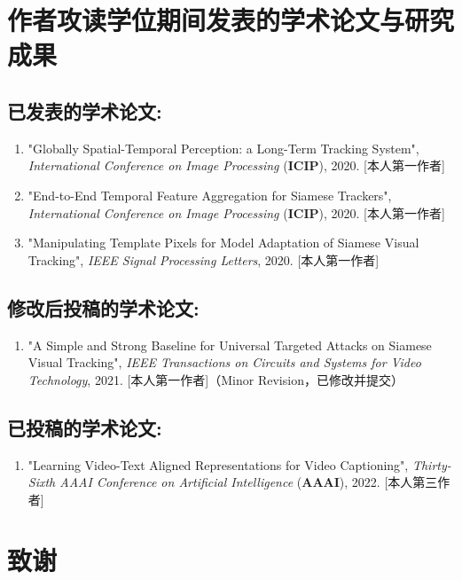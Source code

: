 \chapter{作者攻读学位期间发表的学术论文与研究成果}


\section*{已发表的学术论文:}

{
\setlist[enumerate]{}%
\begin{enumerate}[nosep]
    \item "Globally Spatial-Temporal Perception: a Long-Term Tracking System", \textit{International Conference on Image Processing} (\textbf{ICIP}), 2020. [本人第一作者]
    \item "End-to-End Temporal Feature Aggregation for Siamese Trackers", \textit{International Conference on Image Processing} (\textbf{ICIP}), 2020. [本人第一作者]
    \item "Manipulating Template Pixels for Model Adaptation of Siamese Visual Tracking", \textit{IEEE Signal Processing Letters}, 2020. [本人第一作者]
\end{enumerate}
}

\section*{修改后投稿的学术论文:}
{
\setlist[enumerate]{}%
\begin{enumerate}[nosep]
    \item "A Simple and Strong Baseline for Universal Targeted Attacks on Siamese Visual Tracking", \textit{IEEE Transactions on Circuits and Systems for Video Technology}, 2021. [本人第一作者]（Minor Revision，已修改并提交）
\end{enumerate}
}

\section*{已投稿的学术论文:}

{
\setlist[enumerate]{}%
\begin{enumerate}[nosep]
    \item "Learning Video-Text Aligned Representations for Video Captioning", \textit{Thirty-Sixth AAAI Conference on Artificial Intelligence} (\textbf{AAAI}), 2022. [本人第三作者]
\end{enumerate}
}

\chapter[致谢]{致\quad 谢}%
\thispagestyle{noheaderstyle}%

\cleardoublepage[plain]%
